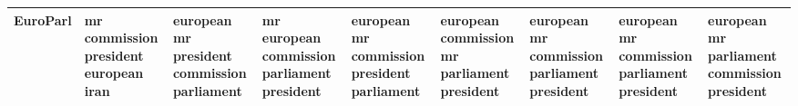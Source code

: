 \documentclass[11pt,a4paper]{article}
\begin{document}
\begin{appendices}
\begin{table*}[htb]
\begin{tiny}
\begin{tabular}{|p{}|p{}|p{}|p{}|p{}|p{}|p{}|p{}|p{}|}
    EuroParl & mr \newline commission \newline president \newline european \newline iran & european \newline mr \newline president \newline commission \newline parliament & mr \newline european \newline commission \newline parliament \newline president & european \newline mr \newline commission \newline president \newline parliament & european \newline commission \newline mr \newline parliament \newline president & european \newline mr \newline commission \newline parliament \newline president & european \newline mr \newline commission \newline parliament \newline president & european \newline mr \newline parliament \newline commission \newline president\\\hline

\end{tabular}
\end{tiny}
\end{table*}
\end{appendices}
\end{document}
